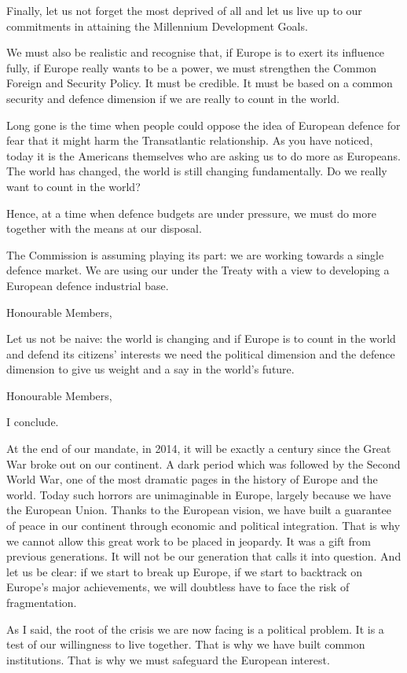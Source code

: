 \documentclass[a4paper,11pt]{article}
\begin{document}
Finally, let us not forget the most deprived of all and let us live up to our commitments in attaining the Millennium Development Goals.

We must also be realistic and recognise that, if Europe is to exert its influence fully, if Europe really wants to be a power, we must strengthen the Common Foreign and Security Policy. It must be credible. It must be based on a common security and defence dimension if we are really to count in the world.

Long gone is the time when people could oppose the idea of European defence for fear that it might harm the Transatlantic relationship. As you have noticed, today it is the Americans themselves who are asking us to do more as Europeans. The world has changed, the world is still changing fundamentally. Do we really want to count in the world?

Hence, at a time when defence budgets are under pressure, we must do more together with the means at our disposal.

The Commission is assuming playing its part: we are working towards a single defence market. We are using our under the Treaty with a view to developing a European defence industrial base.

Honourable Members,

Let us not be naive: the world is changing and if Europe is to count in the world and defend its citizens' interests we need the political dimension and the defence dimension to give us weight and a say in the world's future.

Honourable Members,

I conclude.

At the end of our mandate, in 2014, it will be exactly a century since the Great War broke out on our continent. A dark period which was followed by the Second World War, one of the most dramatic pages in the history of Europe and the world. Today such horrors are unimaginable in Europe, largely because we have the European Union. Thanks to the European vision, we have built a guarantee of peace in our continent through economic and political integration. That is why we cannot allow this great work to be placed in jeopardy. It was a gift from previous generations. It will not be our generation that calls it into question. And let us be clear: if we start to break up Europe, if we start to backtrack on Europe's major achievements, we will doubtless have to face the risk of fragmentation.

As I said, the root of the crisis we are now facing is a political problem. It is a test of our willingness to live together. That is why we have built common institutions. That is why we must safeguard the European interest.
\end{document}
